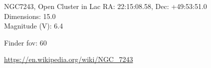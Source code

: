 \begin{block}{NGC7243, Open Cluster in Lac}
    RA: 22:15:08.58, Dec: +49:53:51.0 \\ 
    Dimensions: 15.0 \\ 
    Magnitude (V): 6.4



    Finder fov: 60 

    \url{https://en.wikipedia.org/wiki/NGC_7243} 
\end{block}